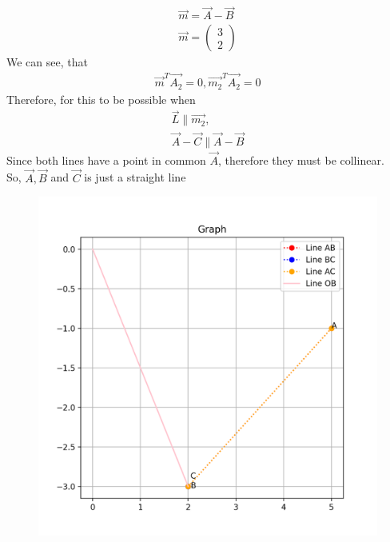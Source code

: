 \documentclass[journal]{IEEEtran}
\begin{document}
\begin{align}
\vec{m}=\vec{A}-\vec{B}\\
\vec{m}=\begin{pmatrix}3\\2\end{pmatrix}
\end{align}
We can see, that
\begin{align}
    \vec{m}^T\vec{A_2}=0,\vec{m_2}^T\vec{A_2}=0
\end{align}
Therefore, for this to be possible when
\begin{align}
    \vec{L} \parallel \vec{m_2}, \\ \vec{A}-\vec{C} \parallel \vec{A}-\vec{B}
\end{align}
Since both lines have a point in common $\vec{A}$, therefore they must be collinear.\\
So, $\vec{A},\vec{B}$ and $\vec{C}$ is just a straight line
\begin{figure}[H]
    \centering
    \includegraphics[width=\columnwidth]{figs/Figure.png}
    \caption{}
    \label{fig:placeholder}
\end{figure}
\end{document}
